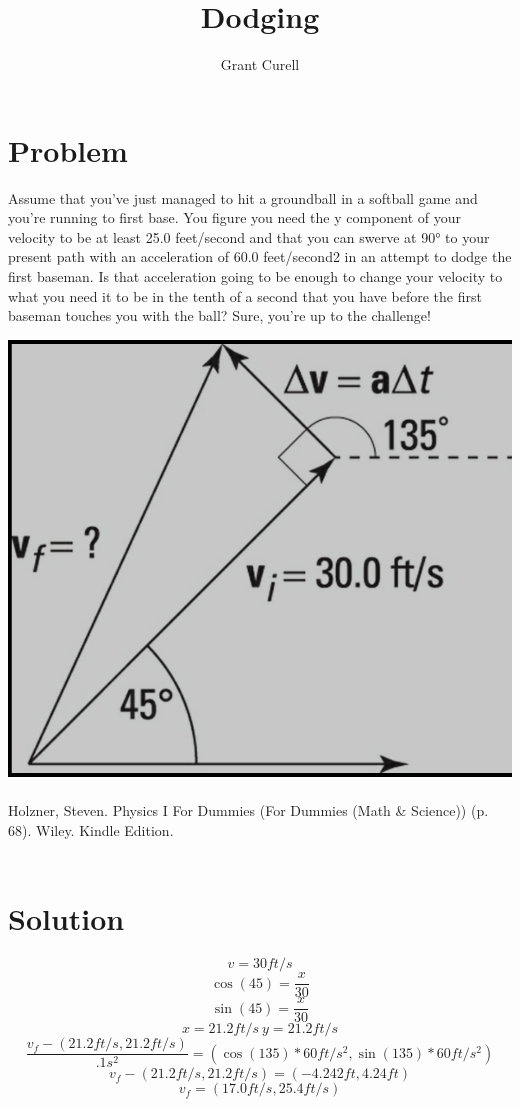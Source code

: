 \documentclass{article}
\title{Dodging}
\author{Grant Curell}
\begin{document}
\maketitle{}
\section{Problem}
Assume that you’ve just managed to hit a groundball in a softball game and you’re running to first base. You figure you need the y component of your velocity to be at least 25.0 feet/second and that you can swerve at \ang{90} to your present path with an acceleration of 60.0 feet/second2 in an attempt to dodge the first baseman. Is that acceleration going to be enough to change your velocity to what you need it to be in the tenth of a second that you have before the first baseman touches you with the ball? Sure, you’re up to the challenge!

\includegraphics[width=\columnwidth]{image}
\\\\
Holzner, Steven. Physics I For Dummies (For Dummies (Math \& Science)) (p. 68). Wiley. Kindle Edition.
\\\\
\section{Solution}
\[ v=30ft/s \]
\[ \cos(45)=\frac{x}{30} \]
\[ \sin(45)=\frac{x}{30} \]
\[ x=21.2ft/s\ y=21.2ft/s \]
\[ \frac{v_f-(21.2ft/s,21.2ft/s)}{.1s^2}=(\cos(135)*60ft/s^2,\sin(135)*60ft/s^2)\]
\[ v_f-(21.2ft/s,21.2ft/s)=(-4.242ft,4.24ft) \]
\[ v_f=(17.0ft/s,25.4ft/s) \]
\end{document}
